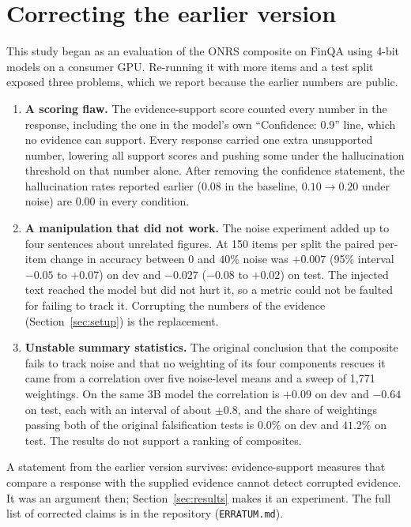 \section{Correcting the earlier version}
\label{sec:erratum}

This study began as an evaluation of the ONRS composite on FinQA using 4-bit models on a consumer GPU.
Re-running it with more items and a test split exposed three problems, which we report because the earlier numbers are public.
\begin{enumerate}[leftmargin=*,itemsep=2pt,topsep=2pt]
\item \textbf{A scoring flaw.} The evidence-support score counted every number in the response, including the one in the model's own ``Confidence: 0.9'' line, which no evidence can support. Every response carried one extra unsupported number, lowering all support scores and pushing some under the hallucination threshold on that number alone. After removing the confidence statement, the hallucination rates reported earlier ($0.08$ in the baseline, $0.10\rightarrow0.20$ under noise) are $0.00$ in every condition.
\item \textbf{A manipulation that did not work.} The noise experiment added up to four sentences about unrelated figures. At 150 items per split the paired per-item change in accuracy between $0$ and $40\%$ noise was $+0.007$ (95\% interval $-0.05$ to $+0.07$) on dev and $-0.027$ ($-0.08$ to $+0.02$) on test. The injected text reached the model but did not hurt it, so a metric could not be faulted for failing to track it. Corrupting the numbers of the evidence (Section~\ref{sec:setup}) is the replacement.
\item \textbf{Unstable summary statistics.} The original conclusion that the composite fails to track noise and that no weighting of its four components rescues it came from a correlation over five noise-level means and a sweep of 1{,}771 weightings. On the same 3B model the correlation is $+0.09$ on dev and $-0.64$ on test, each with an interval of about $\pm0.8$, and the share of weightings passing both of the original falsification tests is $0.0\%$ on dev and $41.2\%$ on test. The results do not support a ranking of composites.
\end{enumerate}
A statement from the earlier version survives: evidence-support measures that compare a response with the supplied evidence cannot detect corrupted evidence.
It was an argument then; Section~\ref{sec:results} makes it an experiment.
The full list of corrected claims is in the repository (\texttt{ERRATUM.md}).

